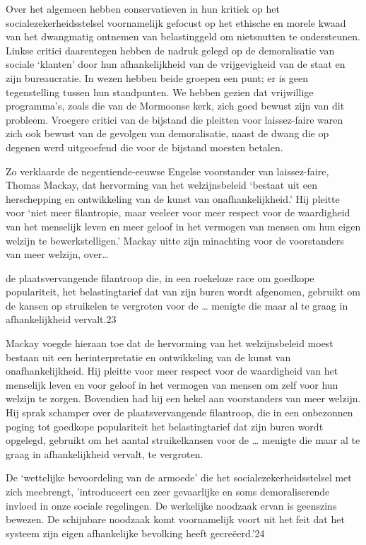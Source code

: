 \documentclass[
  a5paper,
  smalldemyvopaper,10pt,twoside,onecolumn,openright,extrafontsizes,hidelinks]{memoir}
\renewenvironment{quote}%
               {\list{}{\rightmargin=.6cm\leftmargin=.6cm}%
                \itshape \item[]}%
               {\endlist}
\begin{document}
Over het algemeen hebben conservatieven in hun kritiek op het
socialezekerheidsstelsel voornamelijk gefocust op het ethische en morele
kwaad van het dwangmatig ontnemen van belastinggeld om nietsnutten te
ondersteunen. Linkse critici daarentegen hebben de nadruk gelegd op de
demoralisatie van sociale `klanten' door hun afhankelijkheid van de
vrijgevigheid van de staat en zijn bureaucratie. In wezen hebben beide
groepen een punt; er is geen tegenstelling tussen hun standpunten. We
hebben gezien dat vrijwillige programma's, zoals die van de Mormoonse
kerk, zich goed bewust zijn van dit probleem. Vroegere critici van de
bijstand die pleitten voor laissez-faire waren zich ook bewust van de
gevolgen van demoralisatie, naast de dwang die op degenen werd
uitgeoefend die voor de bijstand moesten betalen.

Zo verklaarde de negentiende-eeuwse Engelse voorstander van
laissez-faire, Thomas Mackay, dat hervorming van het welzijnsbeleid
`bestaat uit een herschepping en ontwikkeling van de kunst van
onafhankelijkheid.' Hij pleitte voor `niet meer filantropie, maar
veeleer voor meer respect voor de waardigheid van het menselijk leven en
meer geloof in het vermogen van mensen om hun eigen welzijn te
bewerkstelligen.' Mackay uitte zijn minachting voor de voorstanders van
meer welzijn, over\ldots{}

\begin{quote}
de plaatsvervangende filantroop die, in een roekeloze race om goedkope
populariteit, het belastingtarief dat van zijn buren wordt afgenomen,
gebruikt om de kansen op struikelen te vergroten voor de \ldots{}
menigte die maar al te graag in afhankelijkheid vervalt.23
\end{quote}

Mackay voegde hieraan toe dat de hervorming van het welzijnsbeleid moest
bestaan uit een herinterpretatie en ontwikkeling van de kunst van
onafhankelijkheid. Hij pleitte voor meer respect voor de waardigheid van
het menselijk leven en voor geloof in het vermogen van mensen om zelf
voor hun welzijn te zorgen. Bovendien had hij een hekel aan voorstanders
van meer welzijn. Hij sprak schamper over de plaatsvervangende
filantroop, die in een onbezonnen poging tot goedkope populariteit het
belastingtarief dat zijn buren wordt opgelegd, gebruikt om het aantal
struikelkansen voor de \ldots{} menigte die maar al te graag in
afhankelijkheid vervalt, te vergroten.

\begin{quote}
De `wettelijke bevoordeling van de armoede' die het
socialezekerheidsstelsel met zich meebrengt, 'introduceert een zeer
gevaarlijke en soms demoraliserende invloed in onze sociale regelingen.
De werkelijke noodzaak ervan is geenszins bewezen. De schijnbare
noodzaak komt voornamelijk voort uit het feit dat het systeem zijn eigen
afhankelijke bevolking heeft gecreëerd.'24
\end{quote}
\end{document}
